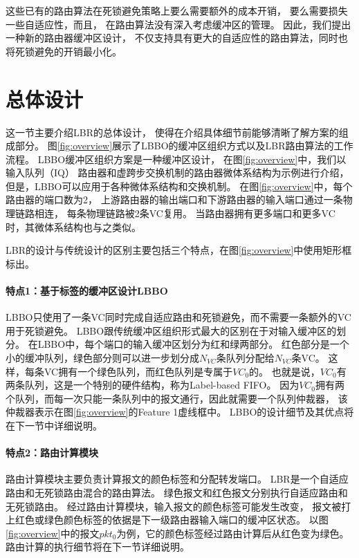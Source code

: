 这些已有的路由算法在死锁避免策略上要么需要额外的成本开销，
要么需要损失一些自适应性，而且，
在路由算法没有深入考虑缓冲区的管理。
因此，我们提出一种新的路由器缓冲区设计，
不仅支持具有更大的自适应性的路由算法，同时也将死锁避免的开销最小化。

\section{总体设计}


这一节主要介绍LBR的总体设计，
使得在介绍具体细节前能够清晰了解方案的组成部分。
图\ref{fig:overview}展示了LBBO的缓冲区组织方式以及LBR路由算法的工作流程。
LBBO缓冲区组织方案是一种缓冲区设计，
在图\ref{fig:overview}中，我们以输入队列（IQ）
路由器和虚跨步交换机制的路由器微体系结构为示例进行介绍，
但是，LBBO可以应用于各种微体系结构和交换机制。
在图\ref{fig:overview}中，每个路由器的端口数为2，
上游路由器的输出端口和下游路由器的输入端口通过一条物理链路相连，
每条物理链路被2条VC复用。
当路由器拥有更多端口和更多VC时，其微体系结构也与之类似。

LBR的设计与传统设计的区别主要包括三个特点，在图\ref{fig:overview}中使用矩形框标出。

\paragraph{特点1：基于标签的缓冲区设计LBBO}
LBBO只使用了一条VC同时完成自适应路由和死锁避免，而不需要一条额外的VC用于死锁避免。
LBBO跟传统缓冲区组织形式最大的区别在于对输入缓冲区的划分。
在LBBO中，每个端口的输入缓冲区划分为红和绿两部分。
红色部分是一个小的缓冲队列，绿色部分则可以进一步划分成$N_{VC}$条队列分配给$N_{VC}$条VC。
这样，每条VC拥有一个绿色队列，而红色队列是专属于$VC_0$的。
也就是说，$VC_0$有两条队列，这是一个特别的硬件结构，称为Label-based FIFO。
因为$VC_0$拥有两个队列，而每一次只能一条队列中的报文通行，因此就需要一个队列仲裁器，
该仲裁器表示在图\ref{fig:overview}的Feature 1虚线框中。
LBBO的设计细节及其优点将在下一节中详细说明。

\paragraph{特点2：路由计算模块}
路由计算模块主要负责计算报文的颜色标签和分配转发端口。
LBR是一个自适应路由和无死锁路由混合的路由算法。
绿色报文和红色报文分别执行自适应路由和无死锁路由。
经过路由计算模块，输入报文的颜色标签可能发生改变，
报文被打上红色或绿色颜色标签的依据是下一级路由器输入端口的缓冲区状态。
以图\ref{fig:overview}中的报文$pkt_0$为例，它的颜色标签经过路由计算后从红色变为绿色。
路由计算的执行细节将在下一节详细说明。

